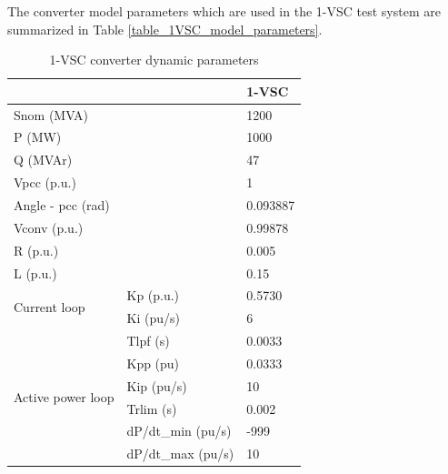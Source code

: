 \documentclass{report}
\begin{document}
The converter model parameters which are used in the 1-VSC test system are summarized in Table \ref{table_1VSC_model_parameters}.
\begin{table}[H]
\centering
\caption{1-VSC converter dynamic parameters}
\begin{tabular}{ll|l}
\multicolumn{2}{l|}{}                                                  & 1-VSC    \\ \hline
\multicolumn{2}{l|}{Snom (MVA)}                                              & 1200     \\ \hline
\multicolumn{2}{l|}{P (MW)}                                            & 1000     \\ \hline
\multicolumn{2}{l|}{Q (MVAr)}                                          & 47       \\ \hline
\multicolumn{2}{l|}{Vpcc (p.u.)}                                              & 1        \\ \hline
\multicolumn{2}{l|}{Angle - pcc (rad)}                                 & 0.093887 \\ \hline
\multicolumn{2}{l|}{Vconv (p.u.)}                                      & 0.99878  \\ \hline
\multicolumn{2}{l|}{R (p.u.)}                                                 & 0.005    \\ \hline
\multicolumn{2}{l|}{L (p.u.)}                                                 & 0.15     \\ \hline
\multicolumn{1}{l|}{\multirow{2}{*}{Current loop}}        & Kp (p.u.)        & 0.5730   \\ \cline{2-3} 
\multicolumn{1}{l|}{}                                     & Ki (pu/s)         & 6        \\ \hline
\multicolumn{1}{l|}{\multirow{6}{*}{Active power loop}}   & Tlpf (s)       & 0.0033   \\ \cline{2-3} 
\multicolumn{1}{l|}{}                                     & Kpp (pu)       & 0.0333   \\ \cline{2-3} 
\multicolumn{1}{l|}{}                                     & Kip (pu/s)       & 10       \\ \cline{2-3} 
\multicolumn{1}{l|}{}                                     & Trlim (s)     & 0.002    \\ \cline{2-3} 
\multicolumn{1}{l|}{}                                     & dP/dt\_min (pu/s) & -999     \\ \cline{2-3} 
\multicolumn{1}{l|}{}                                     & dP/dt\_max (pu/s)& 10       \\ \hline

\end{tabular}
\end{table}
\end{document}
